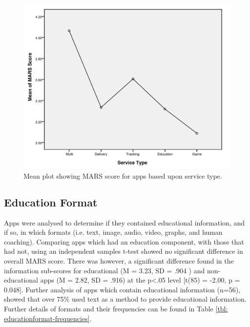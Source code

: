 \begin{figure}[h]
    \centering
    \includegraphics[scale=0.40, angle=0]{Files/prevention-study-1/figures/servicetype-mars-anova}
    \caption{Mean plot showing MARS score for apps based upon service type.}
    \label{fig: servicetype-mars-anova}
\end{figure}

\subsection{Education Format}
Apps were analysed to determine if they contained educational information, and if so, in which formats (i.e. text, image, audio, video, graphs, and human coaching).
Comparing apps which had an education component, with those that had not, using an independent samples t-test showed no significant difference in overall MARS score. There was however, a significant difference found in the information sub-scores for educational (M = 3.23, SD = .904 ) and non-educational apps (M = 2.82, SD = .916) at the p\textless.05 level [t(85) = -2.00, p = 0.048].
Further analysis of apps which contain educational information (n=56), showed that over 75\% used text as a method to provide educational information. Further details of formats and their frequencies can be found in Table \ref{tbl: educationformat-frequencies}.

